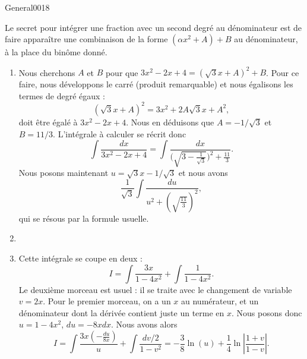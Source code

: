 \begin{corrige}{General0018}

Le secret pour intégrer une fraction avec un second degré au dénominateur est de faire apparaître une combinaison de la forme $(\alpha x^2+A)+B$ au dénominateur, à la place du binôme donné.

\begin{enumerate}

\item
 Nous cherchons $A$ et $B$ pour que $3x^2-2x+4=(\sqrt{3}x+A)^2+B$. Pour ce faire, nous développons le carré (produit remarquable) et nous égalisons les termes de degré égaux :
\begin{equation}
	(\sqrt{3}x+A)^2=3x^2+2A\sqrt{3}x+A^2,
\end{equation}
doit être égalé à $3x^2-2x+4$. Nous en déduisons que $A=-1/\sqrt{3}$ et $B=11/3$. L'intégrale à calculer se récrit donc
\begin{equation}
	\int\frac{ dx }{ 3x^2-2x+4 }=\int\frac{ dx }{ \big( \sqrt{3-\frac{1}{ \sqrt{3} }} \big)^2+\frac{ 11 }{ 3 } }.
\end{equation}
Nous posons maintenant $u=\sqrt{3}x-1/\sqrt{3}$ et nous avons
\begin{equation}
	\frac{1}{ \sqrt{3} }\int\frac{ du }{ u^2+ \left( \sqrt{\frac{ 11 }{ 3 }} \right)^2  },
\end{equation}
qui se résous par la formule usuelle.

\item
\item
Cette intégrale se coupe en deux :
\begin{equation}
	I=\int\frac{ 3x }{ 1-4x^2 }+\int\frac{ 1 }{ 1-4x^2 }.
\end{equation}
Le deuxième morceau est usuel : il se traite avec le changement de variable $v=2x$. Pour le premier morceau, on a un $x$ au numérateur, et un dénominateur dont la dérivée contient juste un terme en $x$. Nous posons donc $u=1-4x^2$, $du=-8xdx$. Nous avons alors
\begin{equation}
	I=\int\frac{ 3x\left( -\frac{ du }{ 8x } \right) }{ u }+\int\frac{ dv/2 }{ 1-v^2 }=-\frac{ 3 }{ 8 }\ln(u)+\frac{1}{ 4 }\ln\left| \frac{ 1+v }{ 1-v } \right| .
\end{equation}


\end{enumerate}
\end{corrige}
